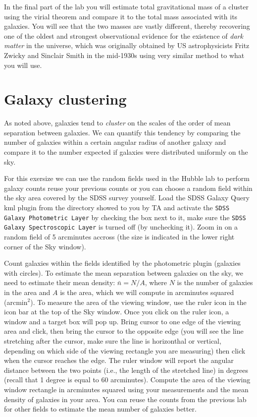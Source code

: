 \documentclass[12pt]{article}
\begin{document}
In the final part of the lab you will estimate total gravitational 
mass of a cluster using the virial theorem and compare it to the 
total mass associated with its galaxies. You will see that the two masses
are vastly different, thereby recovering one of the oldest and strongest 
observational evidence for the existence of {\it dark matter} in the universe, 
which was originally obtained by US astrophysicists 
Fritz Zwicky and Sinclair Smith in the mid-1930s using very similar method to what 
you will use. 

\section*{Galaxy clustering}

As noted above, galaxies tend to {\it cluster} on the scales of the order
of mean separation between galaxies. We can quantify this tendency by 
comparing the number of galaxies within a certain angular radius of 
another galaxy and compare it to the number expected if galaxies
were distributed uniformly on the sky. 

For this exersize we can use the random fields used in the Hubble lab
to perform galaxy counts reuse your previous counts or you can choose a random field within the 
sky area covered by the SDSS survey yourself. Load the SDSS Galaxy Query
kml plugin from the directory showed to you by TA and activate the
\texttt{SDSS Galaxy Photometric Layer} by checking the box next to it, make sure
the \texttt{SDSS Galaxy Spectroscopic Layer} is turned off (by
unchecking it). Zoom in on a random field of 5 arcminutes accross (the size
is indicated in the lower right corner of the Sky window). 

Count galaxies within the fields identified by the photometric plugin (galaxies 
with circles). To estimate the mean separation between galaxies on the sky, 
we need to estimate their mean density: $\bar{n}=N/A$, where $N$ is the number of 
galaxies in the area and $A$ is the area, which we will compute in arcminutes
squared (arcmin$^2$). To measure the area of the viewing window, use the ruler 
icon in the icon bar at the top of the Sky window. Once you click on the ruler
icon, a window and a target box will pop up. Bring cursor to one edge of the viewing
area and click, then bring the cursor to the opposite edge (you will see the line 
stretching after the cursor, make sure the line is horizonthal or vertical, depending
on which side of the viewing rectangle you are measuring) then click when the cursor
reaches the edge. The ruler window will report the angular distance between the two 
points (i.e., the length of the stretched line) in degrees (recall that 1 degree is
equal to 60 arcminutes). Compute the area of the viewing window rectangle in arcminutes
squared using
your measurements and the mean density of galaxies in your area. You can reuse
the counts from the previous lab for other fields to estimate the mean number
of galaxies better. \\[2mm]
\end{document}
